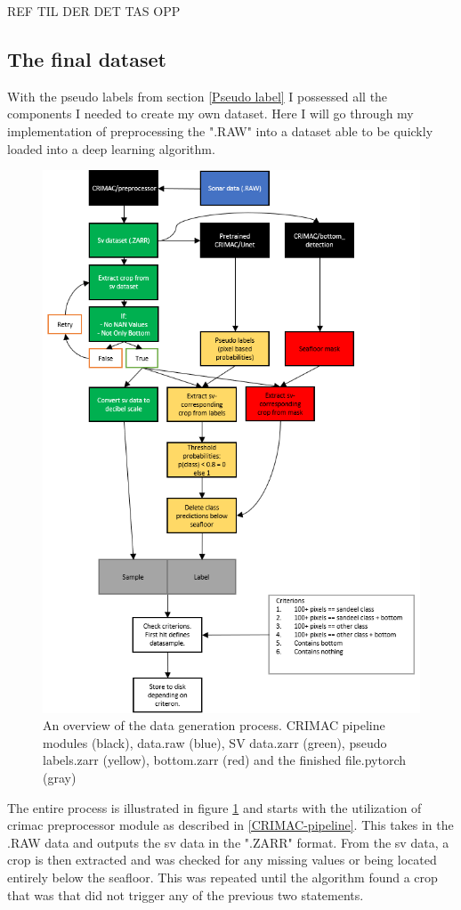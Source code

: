         REF TIL DER DET TAS OPP
        
    \subsection{The final dataset}
        With the pseudo labels from section \ref{Pseudo label} I possessed all the components I needed to create my own dataset. Here I will go through my implementation of preprocessing the ".RAW" into a dataset able to be quickly loaded into a deep learning algorithm.
        \clearpage
        \begin{figure}[H]
            \centering
            \includegraphics[scale=0.8]{figures/flow_data_gen.png}
            \caption{An overview of the data generation process. CRIMAC pipeline modules (black), data.raw (blue), SV data.zarr (green), pseudo labels.zarr (yellow), bottom.zarr (red) and the finished file.pytorch (gray)}
          	\medskip 
            \label{data_generation_flowchart_fig}
        \end{figure}
        The entire process is illustrated in figure \ref{data_generation_flowchart_fig} and starts with the utilization of \gls{crimac} preprocessor module as described in \ref{CRIMAC-pipeline}. This takes in the .RAW data and outputs the \gls{sv} data in the ".ZARR" format. From the \gls{sv} data, a crop is then extracted and was checked for any missing values or being located entirely below the seafloor. This was repeated until the algorithm found a crop that was that did not trigger any of the previous two statements.
        
